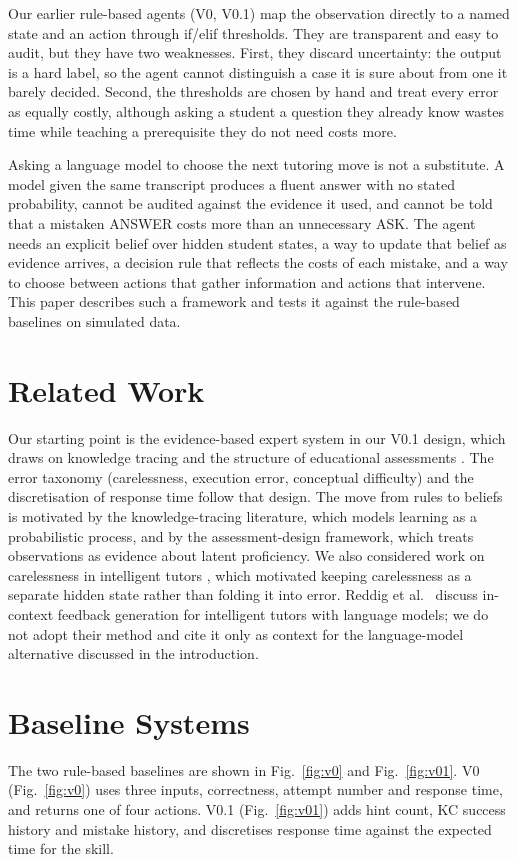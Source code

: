 \documentclass[10pt,letterpaper,twocolumn]{article}
\begin{document}
Our earlier rule-based agents (V0, V0.1) map the observation directly to a named state and an action through if/elif thresholds. They are transparent and easy to audit, but they have two weaknesses. First, they discard uncertainty: the output is a hard label, so the agent cannot distinguish a case it is sure about from one it barely decided. Second, the thresholds are chosen by hand and treat every error as equally costly, although asking a student a question they already know wastes time while teaching a prerequisite they do not need costs more.

Asking a language model to choose the next tutoring move is not a substitute. A model given the same transcript produces a fluent answer with no stated probability, cannot be audited against the evidence it used, and cannot be told that a mistaken ANSWER costs more than an unnecessary ASK. The agent needs an explicit belief over hidden student states, a way to update that belief as evidence arrives, a decision rule that reflects the costs of each mistake, and a way to choose between actions that gather information and actions that intervene. This paper describes such a framework and tests it against the rule-based baselines on simulated data.

\section{Related Work}
Our starting point is the evidence-based expert system in our V0.1 design, which draws on knowledge tracing \cite{corbett1995} and the structure of educational assessments \cite{mislevy2003}. The error taxonomy (carelessness, execution error, conceptual difficulty) and the discretisation of response time follow that design. The move from rules to beliefs is motivated by the knowledge-tracing literature, which models learning as a probabilistic process, and by the assessment-design framework, which treats observations as evidence about latent proficiency. We also considered work on carelessness in intelligent tutors \cite{sanpedro2014}, which motivated keeping carelessness as a separate hidden state rather than folding it into error. Reddig et al.\ \cite{reddig2025} discuss in-context feedback generation for intelligent tutors with language models; we do not adopt their method and cite it only as context for the language-model alternative discussed in the introduction.

\section{Baseline Systems}
The two rule-based baselines are shown in Fig.~\ref{fig:v0} and Fig.~\ref{fig:v01}. V0 (Fig.~\ref{fig:v0}) uses three inputs, correctness, attempt number and response time, and returns one of four actions. V0.1 (Fig.~\ref{fig:v01}) adds hint count, KC success history and mistake history, and discretises response time against the expected time for the skill.
\end{document}
